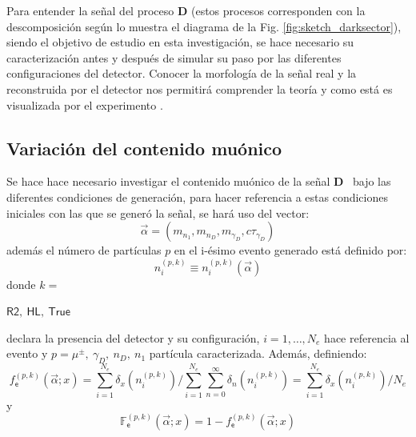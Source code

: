 Para entender la señal del proceso \MSSM\textbf{D} (estos procesos corresponden con la descomposición según lo muestra el diagrama de la Fig. \ref{fig:sketch_darksector}), siendo el objetivo de estudio en esta investigación, se hace necesario su caracterización antes y después de simular su paso por las diferentes configuraciones del detector. Conocer la morfología de la señal real y la reconstruida por el detector nos permitirá comprender la teoría y como está es visualizada por el experimento \CMS.

\subsection{Variación del contenido muónico}

Se hace hace necesario investigar el contenido muónico de la señal \MSSM\textbf{D}~ bajo las diferentes condiciones de generación, para hacer referencia a estas condiciones iniciales con las que se generó la señal, se hará uso del vector:
\begin{equation}
\vec{\alpha} = (m_{n_1}, m_{n_D}, m_{\gamma_D}, c\tau_{\gamma_D})
\end{equation}
además el número de partículas $p$ en el i-ésimo evento generado está definido por:
\begin{equation}\label{numero_particulas}
n_i^{(p,k)} \equiv n_i^{(p,k)} (\vec{\alpha})
\end{equation}
donde 
$k =$ \begin{small}$\textsf{R2},~\textsf{HL}, ~\textsf{True}$\end{small}  declara la presencia del detector y su configuración, 
$i = 1, \ldots, N_{e}$ hace referencia al evento y 
$p = \mu^\pm, ~ \gamma_D, ~n_D, ~n_1$ partícula caracterizada.
Además, definiendo:
\begin{equation}\label{fe}
f^{(p, k)}_\textsf{e} (\vec{\alpha}; x) = \sum_{i=1}^{N_e} \delta_{x}(n_i^{(p,k)})/\sum_{i=1}^{N_e} \sum_{n=0}^\infty \delta_{n} (n_i^{(p,k)}) = \sum_{i=1}^{N_e} \delta_{x}(n_i^{(p,k)})/N_e
\end{equation}
y
\begin{equation}\label{fnInverso}
\mathbb{F}^{(p, k)}_\textsf{e} (\vec{\alpha}; x)= 1 - f^{(p, k)}_\textsf{e}  (\vec{\alpha}; x)
\end{equation}
